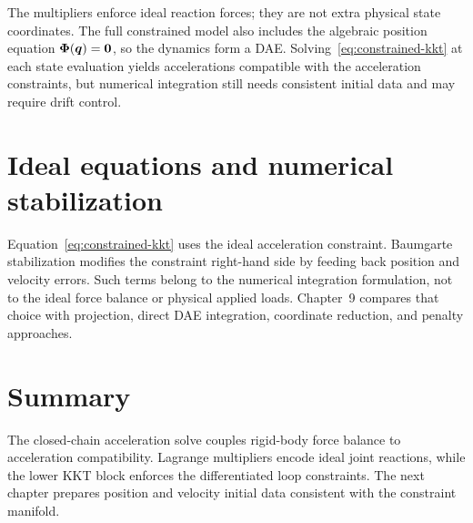 \documentclass[../main.tex]{subfiles}
\begin{document}
The multipliers enforce ideal reaction forces; they are not extra physical state coordinates. The full constrained model also includes the algebraic position equation $\boldsymbol{\Phi}(\boldsymbol{q})=\boldsymbol{0}$, so the dynamics form a DAE. Solving~\eqref{eq:constrained-kkt} at each state evaluation yields accelerations compatible with the acceleration constraints, but numerical integration still needs consistent initial data and may require drift control.

\section{Ideal equations and numerical stabilization}

Equation~\eqref{eq:constrained-kkt} uses the ideal acceleration constraint. Baumgarte stabilization modifies the constraint right-hand side by feeding back position and velocity errors. Such terms belong to the numerical integration formulation, not to the ideal force balance or physical applied loads. Chapter~9 compares that choice with projection, direct DAE integration, coordinate reduction, and penalty approaches.

\section{Summary}

The closed-chain acceleration solve couples rigid-body force balance to acceleration compatibility. Lagrange multipliers encode ideal joint reactions, while the lower KKT block enforces the differentiated loop constraints. The next chapter prepares position and velocity initial data consistent with the constraint manifold.

\ifSubfilesClassLoaded{\backmatter\bookbibliography}{}
\end{document}
